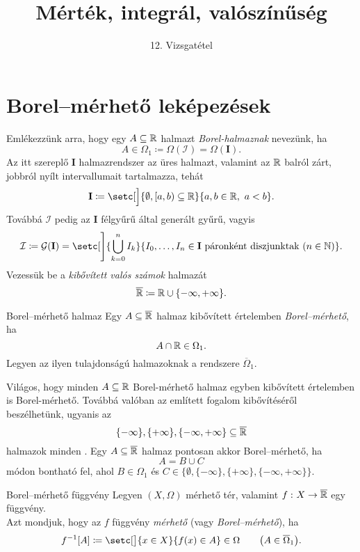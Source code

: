 \documentclass[
]{elteikthesis}[2024/04/26]
\title{Mérték, integrál, valószínűség} %
\subtitle{12. Vizsgatétel}
\begin{document}
	
	
	\section{Borel--mérhető leképezések}
	
	Emlékezzünk arra, hogy egy \( A \subseteq \mathbb{R} \) halmazt \emph{Borel-halmaznak} nevezünk, ha
	\[
		A \in \Omega_1 \coloneq \Omega( \mathcal{I} ) = \Omega( \mathbf{I} ).
	\]
	Az itt szereplő \( \mathbf{I} \) halmazrendszer az üres halmazt, 
	valamint az \( \mathbb{R} \) balról zárt, jobbról nyílt intervallumait tartalmazza, tehát
	\[
		\mathbf{I} \coloneq 
		\setc[\Big]{ \emptyset, [a, b) \subseteq \R }{ a, b \in \R, \ a < b }.
	\]
	Továbbá \( \mathcal{I} \) pedig az \( \mathbf{I} \) félgyűrű által generált gyűrű, vagyis
	\[
		\mathcal{I} \coloneq
		\mathcal{G}( \mathbf{I} ) = 
		\setc[\Bigg]{ \bigcup_{k=0}^{n} I_k }
		            { I_0, \dots, I_n \in \mathbf{I} \text{ páronként diszjunktak } (n \in \N) }.
	\]
	Vezessük be a \emph{kibővített valós számok} halmazát
	\[
		\overline{ \mathbb{R} } \coloneq \mathbb{R} \cup \{ -\infty, +\infty \}.
	\]
	\begin{definition}{Borel--mérhető halmaz}{}
		Egy \( A \subseteq \overline{\mathbb{R}} \) halmaz 
		kibővített értelemben \emph{Borel--mérhető}, ha
		\[
			A \cap \mathbb{R} \in \Omega_1.
		\]
		Legyen az ilyen tulajdonságú halmazoknak a rendszere \( \overline{\Omega}_1 \).
	\end{definition}
	
	\begin{note}
		Világos, hogy minden \( A \subseteq \mathbb{R} \) Borel-mérhető halmaz egyben kibővített 
		értelemben is Borel-mérhető. 
		Továbbá valóban az említett fogalom kibővítéséről beszélhetünk, ugyanis az
		\[
			\{ -\infty \}, \{ +\infty \}, \{ -\infty, +\infty \} \subseteq \overline{ \mathbb{R} }
		\]
		halmazok minden .
		Egy \( A \subseteq \overline{ \mathbb{R} } \) halmaz pontosan akkor Borel--mérhető, ha
		\[
			A = B \cup C
		\]
		módon bontható fel, ahol \( B \in \Omega_1 \) és 
		\( C \in \bigl\{ \emptyset, \{ -\infty \}, \{ +\infty \}, \{ -\infty, +\infty \} \bigr\} \).
	\end{note}
	
	\begin{definition}{Borel--mérhető függvény}{}
		Legyen \( (X, \Omega) \) mérhető tér, 
		valamint \( f \,\colon X \to \overline{\mathbb{R}} \) egy függvény.\\[6pt]
		Azt mondjuk, hogy az \( f \) függvény \emph{mérhető} (vagy \emph{Borel--mérhető}), ha
		\[
			f^{-1}[A] \coloneq
			\setc[\big]{ x \in X }{ f(x) \in A } \in \Omega
			\qquad \bigl( A \in \overline{\Omega}_1 \bigr).
		\]
	\end{definition}
\end{document}
